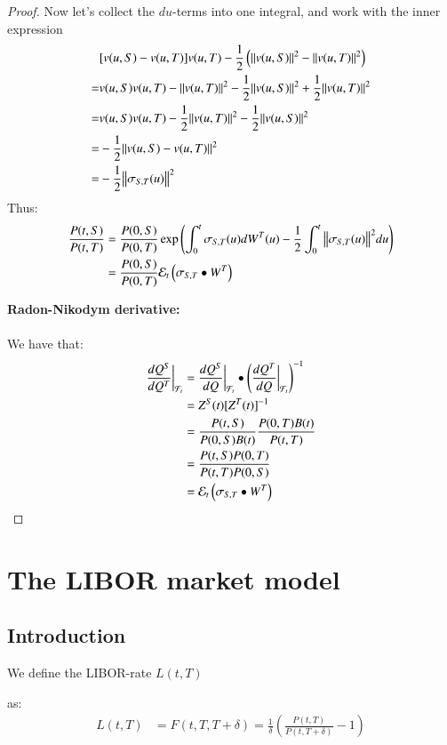 \begin{proof}
\newpage 

Now let's collect the $du$-terms into one integral, and work with the inner expression 
\begin{align*}
&[v(u,S)-v(u,T)]v(u,T) -\frac{1}{2}\left(\norm{v(u,S)}^{2}-\norm{v(u,T)}^{2}\right) \\
=& 
v(u,S)v(u,T)-\norm{v(u,T)}^{2} -\frac{1}{2}\norm{v(u,S)}^{2} + \frac{1}{2}\norm{v(u,T)}^{2} \\ 
=& 
v(u,S)v(u,T)-\frac{1}{2}\norm{v(u,T)}^{2} - \frac{1}{2}\norm{v(u,S)}^{2} \\ 
=& 
-\frac{1}{2}\norm{v(u,S)-v(u,T)}^{2} \\ 
=& -\frac{1}{2}\norm{\sigma_{S,T}(u)}^{2}
\end{align*}
Thus: 
\begin{align*}
\frac{P(t,S)}{P(t,T)}
&= 
\frac{P(0,S)}{P(0,T)}\exp\left(
\int_{0}^{t}\sigma_{S,T}(u)dW^{T}(u) -\frac{1}{2}\int_{0}^{t}\norm{\sigma_{S,T}(u)}^{2}du 
\right) \\ 
&= 
\frac{P(0,S)}{P(0,T)}\mathcal{E}_{t}\left(
\sigma_{S,T}\bullet W^{T}
\right)
\end{align*}

\textbf{Radon-Nikodym derivative:}
\\~\\ 
We have that: 
\begin{align*}
\frac{dQ^{S}}{dQ^{T}}\bigg{|}_{\mathcal{F}_{t}} 
&= 
\frac{dQ^{S}}{dQ}\bigg{|}_{\mathcal{F}_{t}}\bullet\left(
\frac{dQ^{T}}{dQ}\bigg{|}_{\mathcal{F}_{t}}
\right)^{-1} \\ 
&= 
Z^{S}(t)[Z^{T}(t)]^{-1} \\ 
&= 
\frac{P(t,S)}{P(0,S)B(t)}\frac{P(0,T)B(t)}{P(t,T)} \\ 
&= 
\frac{
P(t,S)P(0,T)
}{
P(t,T)P(0,S)
} \\ 
&= 
\mathcal{E}_{t}\left(
\sigma_{S,T}\bullet W^{T}
\right)
\end{align*}
\end{proof}

\newpage 
\section{The LIBOR market model}

\subsection{Introduction}

\begin{definition}
 We define the LIBOR-rate 
 $L(t,T)$ 
 
 as: 
 \begin{align*}
L(t,T) &= F(t,T,T+\delta) 
= \frac{1}{\delta}\left(
\frac{P(t,T)}{P(t,T+\delta)}-1
\right)     
 \end{align*}
\end{definition}

